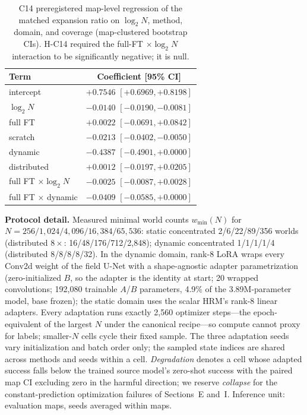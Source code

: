 \documentclass[letterpaper]{article} %
\newcommand{\stage}[1]{\textsc{#1}}
\begin{document}
\begin{table}[t]
\centering
\small
\setlength{\tabcolsep}{3pt}
\begin{tabular}{@{}lc@{}}
\toprule
Term & Coefficient [95\% CI] \\
\midrule
intercept & $+0.7546$ $[+0.6969, +0.8198]$ \\
$\log_2 N$ & $-0.0140$ $[-0.0190, -0.0081]$ \\
full FT & $+0.0022$ $[-0.0691, +0.0842]$ \\
scratch & $-0.0213$ $[-0.0402, -0.0050]$ \\
dynamic & $-0.4387$ $[-0.4901, +0.0000]$ \\
distributed & $+0.0012$ $[-0.0197, +0.0205]$ \\
full FT $\times \log_2 N$ & $-0.0025$ $[-0.0087, +0.0028]$ \\
full FT $\times$ dynamic & $-0.0409$ $[-0.0585, +0.0000]$ \\
\bottomrule
\end{tabular}
\caption{\stage{C14} preregistered map-level regression of the matched expansion ratio on $\log_2 N$, method, domain, and coverage (map-clustered bootstrap CIs). H-C14 required the full-FT $\times \log_2 N$ interaction to be significantly negative; it is null.}
\label{tab:c14reg}
\end{table}

\textbf{Protocol detail.} Measured minimal world counts $w_{\min}(N)$ for $N{=}256/1{,}024/4{,}096/16{,}384/65{,}536$: static concentrated 2/6/22/89/356 worlds (distributed $8\times$: 16/48/176/712/2{,}848); dynamic concentrated 1/1/1/1/4 (distributed 8/8/8/8/32). In the dynamic domain, rank-8 LoRA wraps every Conv2d weight of the field U-Net with a shape-agnostic adapter parametrization (zero-initialized $B$, so the adapter is the identity at start; 20 wrapped convolutions; 192{,}080 trainable $A$/$B$ parameters, 4.9\% of the 3.89M-parameter model, base frozen); the static domain uses the scalar HRM's rank-8 linear adapters. Every adaptation runs exactly 2{,}560 optimizer steps---the epoch-equivalent of the largest $N$ under the canonical recipe---so compute cannot proxy for labels; smaller-$N$ cells cycle their fixed sample. The three adaptation seeds vary initialization and batch order only; the sampled state indices are shared across methods and seeds within a cell. \emph{Degradation} denotes a cell whose adapted success falls below the trained source model's zero-shot success with the paired map CI excluding zero in the harmful direction; we reserve \emph{collapse} for the constant-prediction optimization failures of Sections~E and~I. Inference unit: evaluation maps, seeds averaged within maps.
\end{document}
